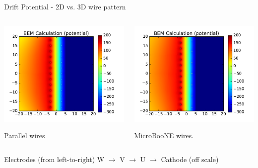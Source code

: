 \documentclass[xcolor=dvipsnames]{beamer}
\newcommand{\microboone}{MicroBooNE\xspace}
\begin{document}
\begin{frame}{Drift Potential - 2D vs. 3D wire pattern}

  \begin{columns}
    \begin{column}{0.5\textwidth}
      \begin{center}
        \includegraphics[height=0.6\textheight]{wirescpa-drift-near.pdf}

        \scriptsize Parallel wires
      \end{center}
    \end{column}
    \begin{column}{0.5\textwidth}
      \begin{center}
        \includegraphics[height=0.6\textheight]{uboone-drift-near.pdf}

        \scriptsize \microboone wires.
      \end{center}
    \end{column}
  \end{columns}
  \begin{center}
    Electrodes (from left-to-right) W $\rightarrow$ V  $\rightarrow$ U  $\rightarrow$ Cathode (off scale)
  \end{center}

\end{frame}
\end{document}
